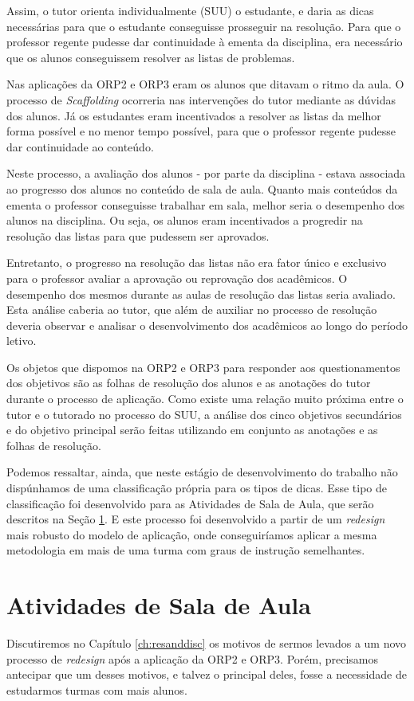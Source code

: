 Assim, o tutor orienta individualmente (SUU) o estudante, e daria as dicas necessárias para que o estudante conseguisse prosseguir na resolução. Para que o professor regente pudesse dar continuidade à ementa da disciplina, era necessário que os alunos conseguissem resolver as listas de problemas.

Nas aplicações da ORP2 e ORP3 eram os alunos que ditavam o ritmo da aula. O processo de \textit{Scaffolding} ocorreria nas intervenções do tutor mediante as dúvidas dos alunos. Já os estudantes eram incentivados a resolver as listas da melhor forma possível e no menor tempo possível, para que o professor regente pudesse dar continuidade ao conteúdo.

Neste processo, a avaliação dos alunos - por parte da disciplina - estava associada ao progresso dos alunos no conteúdo de sala de aula. Quanto mais conteúdos da ementa o professor conseguisse trabalhar em sala, melhor seria o desempenho dos alunos na disciplina. Ou seja, os alunos eram incentivados a progredir na resolução das listas para que pudessem ser aprovados.

Entretanto, o progresso na resolução das listas não era fator único e exclusivo para o professor avaliar a aprovação ou reprovação dos acadêmicos. O desempenho dos mesmos durante as aulas de resolução das listas seria avaliado. Esta análise caberia ao tutor, que além de auxiliar no processo de resolução deveria observar e analisar o desenvolvimento dos acadêmicos ao longo do período letivo.

Os objetos que dispomos na ORP2 e ORP3 para responder aos questionamentos dos objetivos são as folhas de resolução dos alunos e as anotações do tutor durante o processo de aplicação. Como existe uma relação muito próxima entre o tutor e o tutorado no processo do SUU, a análise dos cinco objetivos secundários e do objetivo principal serão feitas utilizando em conjunto as anotações e as folhas de resolução.

Podemos ressaltar, ainda, que neste estágio de desenvolvimento do trabalho não dispúnhamos de uma classificação própria para os tipos de dicas. Esse tipo de classificação foi desenvolvido para as Atividades de Sala de Aula, que serão descritos na Seção \ref{sec:asa}. E este processo foi desenvolvido a partir de um \textit{redesign} mais robusto do modelo de aplicação, onde conseguiríamos aplicar a mesma metodologia em mais de uma turma com graus de instrução semelhantes.

\section{Atividades de Sala de Aula} \label{sec:asa}
Discutiremos no Capítulo \ref{ch:resanddisc} os motivos de sermos levados a um novo processo de \textit{redesign} após a aplicação da ORP2 e ORP3. Porém, precisamos antecipar que um desses motivos, e talvez o principal deles, fosse a necessidade de estudarmos turmas com mais alunos.

